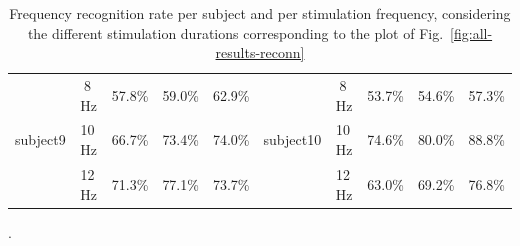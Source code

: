 \documentclass[smallextended]{svjour3}
\begin{document}
\begin{table}[ht]
\begin{center}
\begin{tabular}{ r | c | c | c | c || r | c | c | c | c }
        \hline

        \multirow{3}{*}{subject9} &  8\,Hz & 57.8\% & 59.0\% & 62.9\% & \multirow{3}{*}{subject10} &  8\,Hz & 53.7\% & 54.6\% & 57.3\% \\
                                  & 10\,Hz & 66.7\% & 73.4\% & 74.0\% & & 10\,Hz & 74.6\% & 80.0\% & 88.8\% \\
                                  & 12\,Hz & 71.3\% & 77.1\% & 73.7\% & & 12\,Hz & 63.0\% & 69.2\% & 76.8\% \\

        \hline
                                  

    \end{tabular}
    \caption{Frequency recognition rate per subject and per stimulation frequency, considering the different stimulation durations corresponding to the plot of Fig.~\ref{fig:all-results-reconn}}.
\label{tab:all-results-reconn}
\end{center}\end{table}
\end{document}
